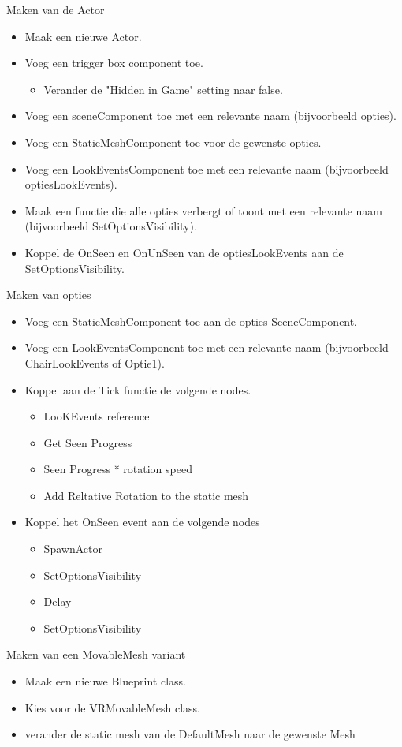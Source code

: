 Maken van de Actor
\begin{itemize}
	\item Maak een nieuwe Actor.
	\item Voeg een trigger box component toe.
		\begin{itemize}
			\item Verander de "Hidden in Game" setting naar false.
		\end{itemize} 
	\item Voeg een sceneComponent toe met een relevante naam (bijvoorbeeld opties).
	\item Voeg een StaticMeshComponent toe voor de gewenste opties.
	\item Voeg een LookEventsComponent toe met een relevante naam (bijvoorbeeld optiesLookEvents).
	\item Maak een functie die alle opties verbergt of toont met een relevante naam (bijvoorbeeld SetOptionsVisibility).
	\item Koppel de OnSeen en OnUnSeen van de optiesLookEvents aan de SetOptionsVisibility.
\end{itemize}

Maken van opties
\begin{itemize}
	\item Voeg een StaticMeshComponent toe aan de opties SceneComponent.
	\item Voeg een LookEventsComponent toe met een relevante naam (bijvoorbeeld ChairLookEvents of Optie1).
	\item Koppel aan de Tick functie de volgende nodes.
		\begin{itemize}
			\item LooKEvents reference
			\item Get Seen Progress
			\item Seen Progress * rotation speed
			\item Add Reltative Rotation to the static mesh
		\end{itemize}
	\item Koppel het OnSeen event aan de volgende nodes
		\begin{itemize}
			\item SpawnActor
			\item SetOptionsVisibility
			\item Delay
			\item SetOptionsVisibility
		\end{itemize}
\end{itemize}

Maken van een MovableMesh variant
\begin{itemize}
	\item Maak een nieuwe Blueprint class.
	\item Kies voor de VRMovableMesh class.
	\item verander de static mesh van de DefaultMesh naar de gewenste Mesh
\end{itemize}

